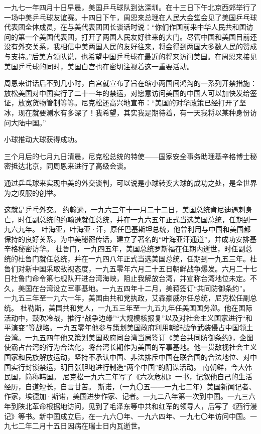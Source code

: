 \begin{maonote}
一九七一年四月十日早晨，美国乒乓球队到达深圳。在十三日下午北京西郊举行了一场中美乒乓球友谊赛。十四日下午，周恩来总理在人民大会堂会见了美国乒乓球代表团全体成员，在与美代表团团长谈话时说：“你们作国前来中华人民共和国访问的第一个美国代表团，打开了两国人民友好往来的大门。尽管中国和美国目前还没有外交关系，我相信中美两国人民的友好往来，将会得到两国大多数人民的赞成与支持。”后美方领队说，也希望中国乒乓球在最近的将来访问美国。在周恩来接见美国乒乓球的同时，美国白宫也在密切注视着这一重要活动。

周恩来讲话后不到几小时，白宫就宣布了旨在缩小两国间鸿沟的一系列开禁措施：放松美国对中国实行了二十一年的禁运，对愿意访问美国的中国人可以加快发给签证，放宽货物管制等等。尼克松还高兴地宣布：“美国的对华政策已经打开了坚冰，现在就要测水有多深了！我希望，其实我是期待着，有一天我将以某种身份访问大陆中国。”

小球推动大球获得成功。

三个月后的七月九日清晨，尼克松总统的特使——国家安全事务助理基辛格博士秘密抵达北京，同周恩来进行了高级会谈。

通过乒乓球来实现中美的外交谈判，可以说是小球转变大球的成功之处，是全世界为之叹服的创举。

这就是乒乓外交。
约翰逊，一九六三年十一月二十二日，美国总统肯尼迪遇刺身亡，时任副总统的约翰逊就任总统，并在一九六五年正式当选美国总统，任期到一九六九年。
叶海亚，叶海亚·汗，原任巴基斯坦总统，他曾利用与中国和美国都保持的良好关系，为中美秘密传话，建立了著名的“叶海亚汗通道”，并成功安排基辛格秘密访华。
杜鲁门，一九四五年，美国总统罗斯福在任期内逝世，时任副总统的杜鲁门就任总统，并在一九四八年正式当选美国总统，任期到一九五三年。杜鲁们对新中国采取敌视态度，一九五零年六月二十五日朝鲜战争爆发。六月二十七日杜鲁门命令第七舰队开进台湾海峡，阻止我解放台湾，并宣称台湾地位未定。不久，美国在台湾设立军事基地。一九五四年十二月，美蒋签订“共同防御条约”。
一九五三年至一九六一年，美国由共和党执政，艾森豪威尔任总统，尼克松任副总统。
杜勒斯，美国共和党人，一九五三年至一九五九年任美国国务卿。他在国际活动中，鼓吹冷战，推行“战争边缘”“大规模核报复”以及对社会主义国家进行“和平演变”等战略。一九五零年他参与策划美国政府利用朝鲜战争武装侵占中国领土台湾。一九五四年他又策划美国政府同台湾当局签订《美台共同防御条约》，企图使霸占台湾的行为合法化，将台湾长期作为美国的军事基地。他一贯敌视社会主义国家和民族解放运动，坚持不承认中国、非法排斥中国在联合国的合法地位、对中国实行封锁禁运，明目张胆地进行制造“两个中国”的阴谋活动。
南朝鲜，今大韩民国，简称韩国。
尼克松一九六二年写了《六次危机》一书，记叙他自己的生活经历，自道短长，自言甘苦。
斯诺，（一九〇五——一九七二年）美国新闻记者、作家，埃德加·斯诺，美国进步作家、记者。一九二八年第一次到中国。一九三六年到陕北革命根据地访问，见到了毛泽东等中共和红军的领导人，后写了《西行漫记》等书。新中国成立后，在一九六〇年、一九六四年、一九七〇年访问中国。一九七二年二月十五日因病在瑞士日内瓦逝世。


\end{maonote}
